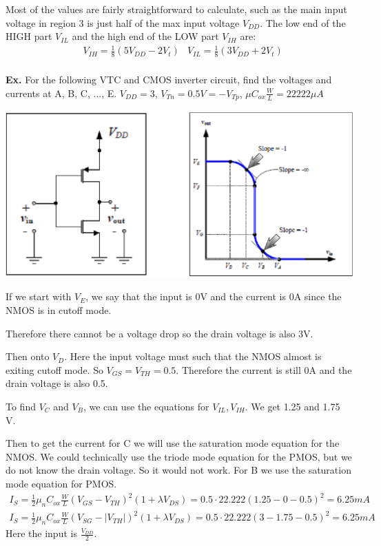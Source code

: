 \documentclass[12pt,letterpaper]{article} \usepackage{amsmath} \usepackage{graphicx} \usepackage[margin=1in]{geometry} \usepackage{longtable}  \usepackage{amssymb}
\begin{document}
	Most of the values are fairly straightforward to calculate, such as the main input voltage in region 3 is just half of the max input voltage $V_{DD}$. The low end of the HIGH part $V_{IL}$ and the high end of the LOW part $V_{IH}$ are:
	\begin{align*}
		&V_{IH} = \frac{1}{8} (5V_{DD} - 2V_t)  &V_{IL} = \frac{1}{8} (3V_{DD} + 2V_t)		\\
	\end{align*}

	\begin{mdframed}
		\textbf{Ex.} For the following VTC and CMOS inverter circuit, find the voltages and currents at A, B, C, ..., E. $V_{DD} = 3$, $V_{Tn} = 0.5V = -V_{Tp}$, $\mu C_{ox}\frac{W}{L} = 22222\mu A$
		\begin{center}
			\includegraphics[width=0.8\linewidth]{cmos-ex}
		\end{center}
		If we start with $V_E$, we say that the input is 0V and the current is 0A since the NMOS is in cutoff mode. 
		
		Therefore there cannot be a voltage drop so the drain voltage is also 3V. 
		
		Then onto $V_D$. Here the input voltage must such that the NMOS almost is exiting cutoff mode. So $V_{GS} = V_{TH} = 0.5$. Therefore the current is still 0A and the drain voltage is also 0.5.
		
		To find $V_C$ and $V_B$, we can use the equations for $V_{IL}, V_{IH}$. We get 1.25 and 1.75 V. 
		
		Then to get the current for C we will use the saturation mode equation for the NMOS. We could technically use the triode mode equation for the PMOS, but we do not know the drain voltage. So it would not work. For B we use the saturation mode equation for PMOS.
		\begin{align*}
			I_S = \frac{1}{2}\mu_n C_{ox} \frac{W}{L} (V_{GS} - V_{TH})^2(1+\lambda V_{DS}) = 0.5\cdot 22.222(1.25-0 - 0.5)^2 = 6.25mA\\
			I_S = \frac{1}{2}\mu_n C_{ox} \frac{W}{L} (V_{SG} - |V_{TH}|)^2(1+\lambda V_{DS}) = 0.5\cdot 22.222(3-1.75 - 0.5)^2 = 6.25mA
		\end{align*}
		Here the input is $\frac{V_{DD}}{2}$.
		

\end{mdframed}
\end{document}
